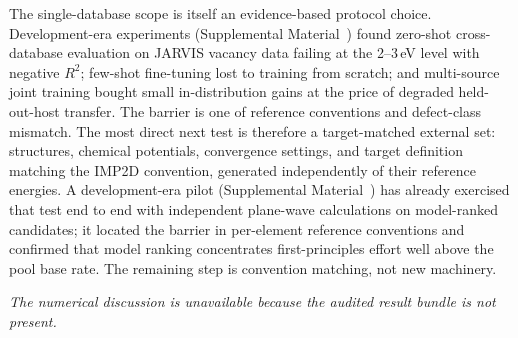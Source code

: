 The single-database scope is itself an evidence-based protocol choice.
Development-era experiments (Supplemental Material~\cite{supplemental})
found zero-shot cross-database evaluation on JARVIS vacancy data failing
at the 2--3\,eV level with negative $R^2$; few-shot fine-tuning lost to
training from scratch; and multi-source joint training bought small
in-distribution gains at the price of degraded held-out-host transfer.
The barrier is one of reference conventions and defect-class mismatch.
The most direct next test is therefore a target-matched external set:
structures, chemical potentials, convergence settings, and target
definition matching the IMP2D convention, generated independently of their
reference energies.  A development-era pilot (Supplemental
Material~\cite{supplemental}) has already exercised that test end to end
with independent plane-wave calculations on model-ranked candidates; it
located the barrier in per-element reference conventions and confirmed
that model ranking concentrates first-principles effort well above the
pool base rate.  The remaining step is convention matching, not new
machinery.

\else

\noindent\textit{The numerical discussion is unavailable because the audited
result bundle is not present.}

\fi
